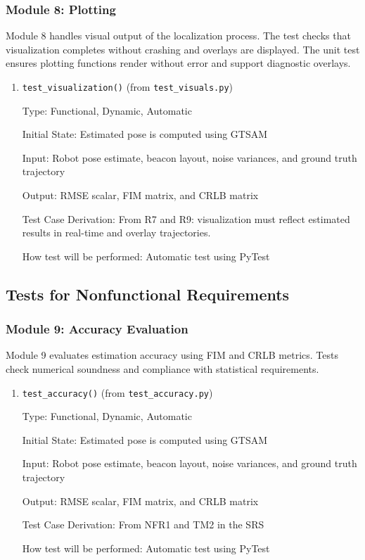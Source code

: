 \documentclass[12pt, titlepage]{article}
\begin{document}
\subsubsection{Module 8: Plotting}
Module 8 handles visual output of the localization process. The test checks that visualization completes without crashing and overlays are displayed. The unit test ensures plotting functions render without error and support diagnostic overlays.

\begin{enumerate}
  \item {\texttt{test\_visualization()} (from \texttt{test\_visuals.py})}
  
  Type: Functional, Dynamic, Automatic
            
  Initial State: Estimated pose is computed using GTSAM
            
  Input: Robot pose estimate, beacon layout, noise variances, and ground truth trajectory
            
  Output: RMSE scalar, FIM matrix, and CRLB matrix
  
  Test Case Derivation: From R7 and R9: visualization must reflect estimated results in real-time and overlay trajectories.
  
  How test will be performed: Automatic test using PyTest
\end{enumerate}



\subsection{Tests for Nonfunctional Requirements}

\subsubsection{Module 9: Accuracy Evaluation}
Module 9 evaluates estimation accuracy using FIM and CRLB metrics. Tests check numerical soundness and compliance with statistical requirements.

\begin{enumerate}
  \item {\texttt{test\_accuracy()} (from \texttt{test\_accuracy.py})}
  
  Type: Functional, Dynamic, Automatic
            
  Initial State: Estimated pose is computed using GTSAM
            
  Input: Robot pose estimate, beacon layout, noise variances, and ground truth trajectory
            
  Output: RMSE scalar, FIM matrix, and CRLB matrix
  
  Test Case Derivation: From NFR1 and TM2 in the SRS
  
  How test will be performed: Automatic test using PyTest
\end{enumerate}
\end{document}
